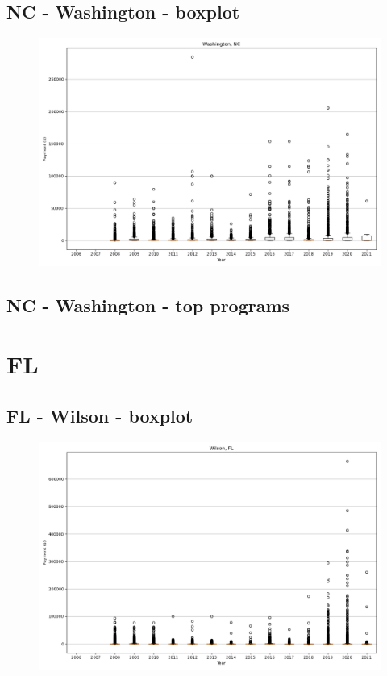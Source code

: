 \subsection*{NC - Washington - boxplot}
\begin{figure}[h]
\centering
\includegraphics[width=7in]{../output/boxplots/counties/Washington-NC_boxplot.png}
\end{figure}


\subsection*{NC - Washington - top programs}

\newpage
\section*{FL}
\subsection*{FL - Wilson - boxplot}
\begin{figure}[h]
\centering
\includegraphics[width=7in]{../output/boxplots/counties/Wilson-FL_boxplot.png}
\end{figure}


